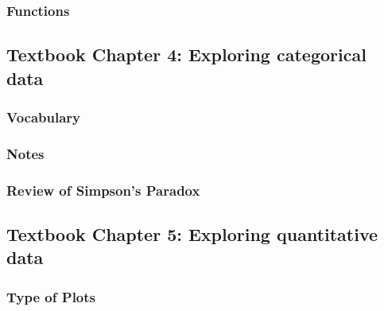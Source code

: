 \documentclass[
]{report}
\begin{document}
\hypertarget{functions}{%
\subsubsection*{Functions}\label{functions}}

\hypertarget{textbook-chapter-4-exploring-categorical-data}{%
\subsection*{Textbook Chapter 4: Exploring categorical data}\label{textbook-chapter-4-exploring-categorical-data}}

\hypertarget{vocabulary-3}{%
\subsubsection*{Vocabulary}\label{vocabulary-3}}

\hypertarget{notes-4}{%
\subsubsection*{Notes}\label{notes-4}}

\hypertarget{review-of-simpsons-paradox}{%
\subsubsection*{Review of Simpson's Paradox}\label{review-of-simpsons-paradox}}

\hypertarget{textbook-chapter-5-exploring-quantitative-data}{%
\subsection*{Textbook Chapter 5: Exploring quantitative data}\label{textbook-chapter-5-exploring-quantitative-data}}

\hypertarget{type-of-plots}{%
\subsubsection*{Type of Plots}\label{type-of-plots}}
\end{document}
